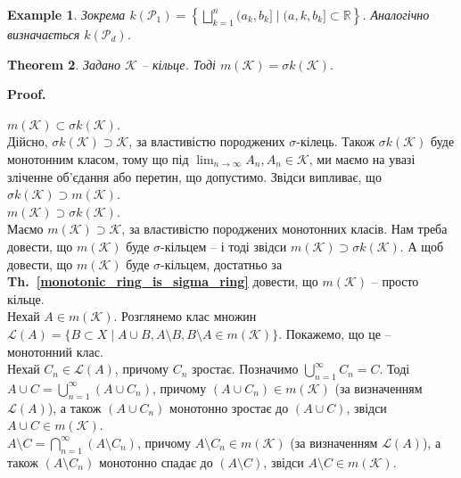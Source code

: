 \documentclass[a4paper, 10pt]{article}
\makeatletter
\theoremstyle{theoremdd}
\newtheorem{theorem}{Theorem}[subsection]
\newtheorem{example}[theorem]{Example}
\newcommand\thref[1]{\textbf{Th.~\ref{#1}}}
\renewenvironment{proof}[1][Proof.\\]{\par
\pushQED{\hfill \qed}%
\normalfont \topsep6\p@\@plus6\p@\relax
\trivlist
\item\relax
{\bfseries
#1\@addpunct{.}}\hspace\labelsep\ignorespaces
}{%
\popQED\endtrivlist\@endpefalse
}
\makeatother
\begin{document}
\begin{example}
Зокрема $k(\mathcal{P}_1) = \displaystyle\left\{ \bigsqcup_{k=1}^n (a_k,b_k] \mid (a,k,b_k] \subset \mathbb{R} \right\}$. Аналогічно визначається $k(\mathcal{P}_d)$.
\end{example}

\begin{theorem}
\label{monotonic_class_generated_by_ring_is_sigma_ring_generated_by_ring}
Задано $\mathcal{K}$ -- кільце. Тоді $m(\mathcal{K}) = \sigma k(\mathcal{K})$.
\end{theorem}

\begin{proof}
$m(\mathcal{K}) \subset \sigma k(\mathcal{K})$.\\
Дійсно, $\sigma k(\mathcal{K}) \supset \mathcal{K}$, за властивістю породжених $\sigma$-кілець. Також $\sigma k(\mathcal{K})$ буде монотонним класом, тому що під $\displaystyle\lim_{n \to \infty} A_n, A_n \in \mathcal{K}$, ми маємо на увазі зліченне об'єдання або перетин, що допустимо. Звідси випливає, що $\sigma k(\mathcal{K}) \supset m(\mathcal{K})$.
\bigskip \\
$m(\mathcal{K}) \supset \sigma k(\mathcal{K})$.\\
Маємо $m(\mathcal{K}) \supset \mathcal{K}$, за властивістю породжених монотонних класів. Нам треба довести, що $m(\mathcal{K})$ буде $\sigma$-кільцем -- і тоді звідси $m(\mathcal{K}) \supset \sigma k(\mathcal{K})$. А щоб довести, що $m(\mathcal{K})$ буде $\sigma$-кільцем, достатньо за \thref{monotonic_ring_is_sigma_ring} довести, що $m(\mathcal{K})$ -- просто кільце.\\
Нехай $A \in m(\mathcal{K})$. Розглянемо клас множин $\mathcal{L}(A) = \{B \subset X \mid A \cup B, A \setminus B, B \setminus A \in m(\mathcal{K})\}$. Покажемо, що це -- монотонний клас.\\
Нехай $C_n \in \mathcal{L}(A)$, причому $C_n$ зростає. Позначимо $\displaystyle\bigcup_{n=1}^\infty C_n = C$. Тоді\\
$A \cup C = \displaystyle\bigcup_{n=1}^\infty (A \cup C_n)$, причому $(A \cup C_n) \in m(\mathcal{K})$ (за визначенням $\mathcal{L}(A)$), а також $(A \cup C_n)$ монотонно зростає до $(A \cup C)$, звідси $A \cup C \in m(\mathcal{K})$.\\
$A \setminus C = \displaystyle\bigcap_{n=1}^\infty (A \setminus C_n)$, причому $A \setminus C_n \in m(\mathcal{K})$ (за визначенням $\mathcal{L}(A)$), а також $(A \setminus C_n)$ монотонно спадає до $(A \setminus C)$, звідси $A \setminus C \in m(\mathcal{K})$.\\

\end{proof}
\end{document}
